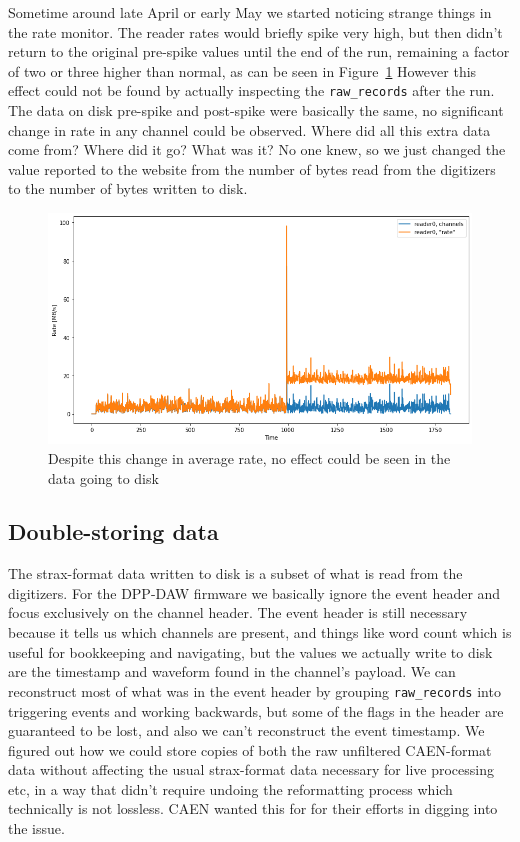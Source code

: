 Sometime around late April or early May we started noticing strange things in the rate monitor.
The reader rates would briefly spike very high, but then didn't return to the original pre-spike values until the end of the run, remaining a factor of two or three higher than normal, as can be seen in Figure~\ref{fig:anomalous_rate}
However this effect could not be found by actually inspecting the \texttt{raw\_records} after the run.
The data on disk pre-spike and post-spike were basically the same, no significant change in rate in any channel could be observed.
Where did all this extra data come from?
Where did it go?
What was it?
No one knew, so we just changed the value reported to the website from the number of bytes read from the digitizers to the number of bytes written to disk.
\begin{figure}[htb]
  \includegraphics[width=\textwidth]{images/anomalous_rate}
  \caption{Despite this change in average rate, no effect could be seen in the data going to disk}\label{fig:anomalous_rate}
\end{figure}

\subsection{Double-storing data}

The strax-format data written to disk is a subset of what is read from the digitizers.
For the DPP-DAW firmware we basically ignore the event header and focus exclusively on the channel header.
The event header is still necessary because it tells us which channels are present, and things like word count which is useful for bookkeeping and navigating, but the values we actually write to disk are the timestamp and waveform found in the channel's payload.
We can reconstruct most of what was in the event header by grouping \texttt{raw\_records} into triggering events and working backwards, but some of the flags in the header are guaranteed to be lost, and also we can't reconstruct the event timestamp.
We figured out how we could store copies of both the raw unfiltered CAEN-format data without affecting the usual strax-format data necessary for live processing etc, in a way that didn't require undoing the reformatting process which technically is not lossless.
CAEN wanted this for for their efforts in digging into the issue.

